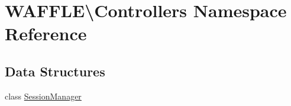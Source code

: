 \hypertarget{namespace_w_a_f_f_l_e_1_1_controllers}{}\section{W\+A\+F\+F\+LE\textbackslash{}Controllers Namespace Reference}
\label{namespace_w_a_f_f_l_e_1_1_controllers}
\subsection*{Data Structures}
\begin{DoxyCompactItemize}
\item 
class \hyperlink{class_w_a_f_f_l_e_1_1_controllers_1_1_session_manager}{Session\+Manager}
\end{DoxyCompactItemize}
